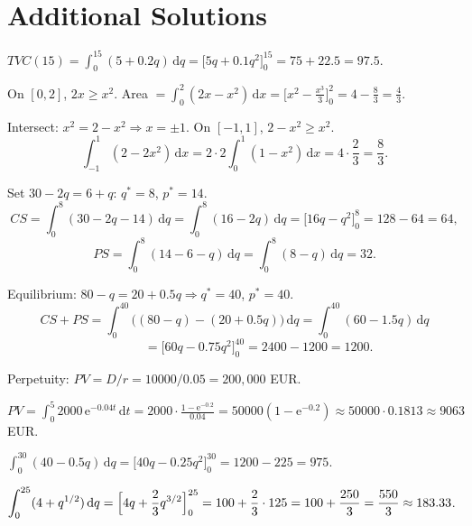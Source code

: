 \section{Additional Solutions}

\begin{solutions}
  \item $\displaystyle TVC(15)=\int_{0}^{15} (5+0.2q)\,\mathrm{d}q
        =\bigl[5q+0.1q^{2}\bigr]_{0}^{15}=75+22.5=97.5$.

  \item On $[0,2]$, $2x\ge x^{2}$. Area
        $=\displaystyle\int_{0}^{2} (2x-x^{2})\,\mathrm{d}x
        =\bigl[x^{2}-\tfrac{x^{3}}{3}\bigr]_{0}^{2}=4-\tfrac{8}{3}
        =\tfrac{4}{3}$.

  \item Intersect: $x^{2}=2-x^{2}\Rightarrow x=\pm 1$. On $[-1,1]$,
        $2-x^{2}\ge x^{2}$.
        \[
          \int_{-1}^{1} (2-2x^{2})\,\mathrm{d}x
            =2\cdot 2\int_{0}^{1} (1-x^{2})\,\mathrm{d}x
            =4\cdot\frac{2}{3}=\frac{8}{3} .
        \]

  \item Set $30-2q=6+q$: $q^{*}=8$, $p^{*}=14$.
        \[
          CS=\int_{0}^{8} (30-2q-14)\,\mathrm{d}q
            =\int_{0}^{8}(16-2q)\,\mathrm{d}q
            =\bigl[16q-q^{2}\bigr]_{0}^{8}=128-64=64,
        \]
        \[
          PS=\int_{0}^{8} (14-6-q)\,\mathrm{d}q=\int_{0}^{8}(8-q)\,\mathrm{d}q=32 .
        \]

  \item Equilibrium: $80-q=20+0.5q \Rightarrow q^{*}=40$, $p^{*}=40$.
        \[
          CS+PS=\int_{0}^{40} \bigl((80-q)-(20+0.5q)\bigr)\,\mathrm{d}q
            =\int_{0}^{40} (60-1.5q)\,\mathrm{d}q
        \]
        \[
          \phantom{CS+PS}=\bigl[60q-0.75q^{2}\bigr]_{0}^{40}=2400-1200=1200 .
        \]

  \item Perpetuity: $PV=D/r=10000/0.05=200{,}000$ EUR.

  \item $\displaystyle PV=\int_{0}^{5} 2000\,\mathrm{e}^{-0.04t}\,\mathrm{d}t
        =2000\cdot\frac{1-\mathrm{e}^{-0.2}}{0.04}=50000(1-\mathrm{e}^{-0.2})
        \approx 50000\cdot 0.1813\approx 9063$ EUR.

  \item $\displaystyle\int_{0}^{30} (40-0.5q)\,\mathrm{d}q
        =\bigl[40q-0.25q^{2}\bigr]_{0}^{30}=1200-225=975$.

  \item $\displaystyle\int_{0}^{25} (4+q^{1/2})\,\mathrm{d}q
        =\Bigl[4q+\frac{2}{3}q^{3/2}\Bigr]_{0}^{25}=100+\frac{2}{3}\cdot 125
        =100+\frac{250}{3}=\frac{550}{3}\approx 183.33$.


\end{solutions}
